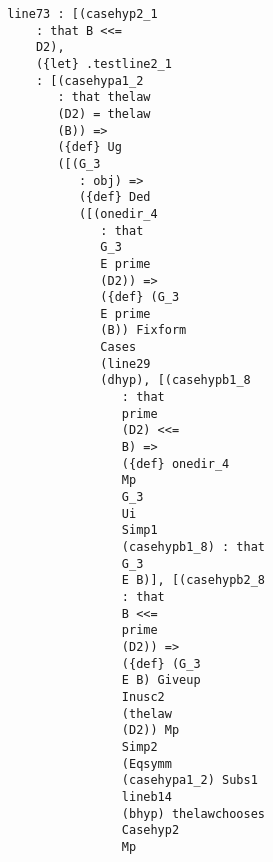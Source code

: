 \documentclass[12pt]{article}
\begin{document}
\begin{verbatim}
                           line73 : [(casehyp2_1 
                               : that B <<= 
                               D2), 
                               ({let} .testline2_1 
                               : [(casehypa1_2 
                                  : that thelaw 
                                  (D2) = thelaw 
                                  (B)) => 
                                  ({def} Ug 
                                  ([(G_3 
                                     : obj) => 
                                     ({def} Ded 
                                     ([(onedir_4 
                                        : that 
                                        G_3 
                                        E prime 
                                        (D2)) => 
                                        ({def} (G_3 
                                        E prime 
                                        (B)) Fixform 
                                        Cases 
                                        (line29 
                                        (dhyp), [(casehypb1_8 
                                           : that 
                                           prime 
                                           (D2) <<= 
                                           B) => 
                                           ({def} onedir_4 
                                           Mp 
                                           G_3 
                                           Ui 
                                           Simp1 
                                           (casehypb1_8) : that 
                                           G_3 
                                           E B)], [(casehypb2_8 
                                           : that 
                                           B <<= 
                                           prime 
                                           (D2)) => 
                                           ({def} (G_3 
                                           E B) Giveup 
                                           Inusc2 
                                           (thelaw 
                                           (D2)) Mp 
                                           Simp2 
                                           (Eqsymm 
                                           (casehypa1_2) Subs1 
                                           lineb14 
                                           (bhyp) thelawchooses 
                                           Casehyp2 
                                           Mp 

\end{verbatim}
\end{document}
